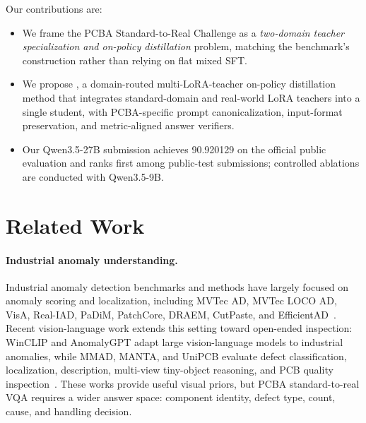 \documentclass[sigconf, screen, review, anonymous]{acmart}
\begin{document}
Our contributions are:
\begin{itemize}
  \item We frame the PCBA Standard-to-Real Challenge as a \emph{two-domain teacher specialization and on-policy distillation} problem, matching the benchmark's construction rather than relying on flat mixed SFT.
  \item We propose \method, a domain-routed multi-LoRA-teacher on-policy distillation method that integrates standard-domain and real-world LoRA teachers into a single student, with PCBA-specific prompt canonicalization, input-format preservation, and metric-aligned answer verifiers.
  \item Our Qwen3.5-27B submission achieves 90.920129 on the official public evaluation and ranks first among public-test submissions; controlled ablations are conducted with Qwen3.5-9B.
\end{itemize}

\section{Related Work}
\label{sec:related}

\paragraph{Industrial anomaly understanding.}
Industrial anomaly detection benchmarks and methods have largely focused on anomaly scoring and localization, including MVTec AD, MVTec LOCO AD, VisA, Real-IAD, PaDiM, PatchCore, DRAEM, CutPaste, and EfficientAD~\cite{bergmann2019mvtec,bergmann2022loco,zou2022visa,wang2024realiad,defard2021padim,roth2022patchcore,zavrtanik2021draem,li2021cutpaste,batzner2024efficientad}. Recent vision-language work extends this setting toward open-ended inspection: WinCLIP and AnomalyGPT adapt large vision-language models to industrial anomalies, while MMAD, MANTA, and UniPCB evaluate defect classification, localization, description, multi-view tiny-object reasoning, and PCB quality inspection~\cite{jeong2023winclip,gu2023anomalygpt,jiang2025mmad,fan2025manta,unipcb2026}. These works provide useful visual priors, but PCBA standard-to-real VQA requires a wider answer space: component identity, defect type, count, cause, and handling decision.
\end{document}
